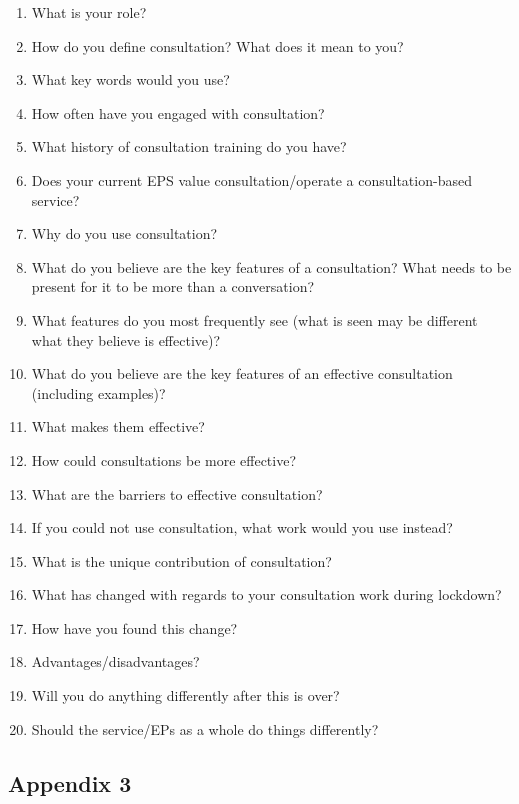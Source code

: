 \documentclass[
]{article}
\providecommand{\tightlist}{%
  \setlength{\itemsep}{0pt}\setlength{\parskip}{0pt}}
\begin{document}
\begin{enumerate}
\def\labelenumi{\arabic{enumi})}
\tightlist
\item
  What is your role?
\item
  How do you define consultation? What does it mean to you?
\item
  What key words would you use?
\item
  How often have you engaged with consultation?
\item
  What history of consultation training do you have?
\item
  Does your current EPS value consultation/operate a consultation-based
  service?
\item
  Why do you use consultation?
\item
  What do you believe are the key features of a consultation? What needs
  to be present for it to be more than a conversation?
\item
  What features do you most frequently see (what is seen may be
  different what they believe is effective)?
\item
  What do you believe are the key features of an effective consultation
  (including examples)?
\item
  What makes them effective?
\item
  How could consultations be more effective?
\item
  What are the barriers to effective consultation?
\item
  If you could not use consultation, what work would you use instead?
\item
  What is the unique contribution of consultation?
\item
  What has changed with regards to your consultation work during
  lockdown?
\item
  How have you found this change?
\item
  Advantages/disadvantages?
\item
  Will you do anything differently after this is over?
\item
  Should the service/EPs as a whole do things differently?
\end{enumerate}

\hypertarget{appendix-3}{%
\subsection{Appendix 3}\label{appendix-3}}
\end{document}
